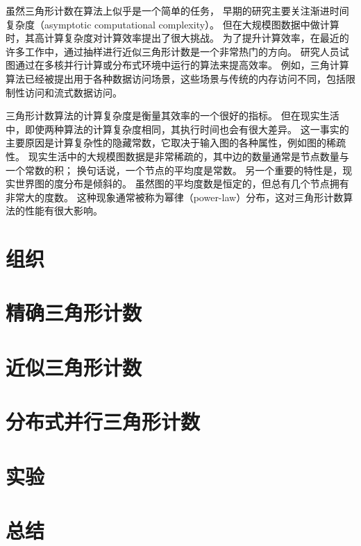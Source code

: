 虽然三角形计数在算法上似乎是一个简单的任务，
早期的研究主要关注渐进时间复杂度（asymptotic computational complexity）\citep{itai1978finding, alon1997finding}。
但在大规模图数据中做计算时，其高计算复杂度对计算效率提出了很大挑战。
为了提升计算效率，在最近的许多工作中，通过抽样进行近似三角形计数是一个非常热门的方向\citep{tsourakakis2008fast,rahman2014sampling,rahman2013approximate,tsourakakis2009doulion,jha2015space,seshadhri2013triadic}。
研究人员试图通过在多核并行计算或分布式环境中运行的算法来提高效率\citep{rahman2013approximate,tsourakakis2009doulion,suri2011counting}。
例如，三角计算算法已经被提出用于各种数据访问场景，这些场景与传统的内存访问不同，包括限制性访问\citep{rahman2014sampling}和流式数据访问\citep{seshadhri2013triadic,buriol2006counting}。

三角形计数算法的计算复杂度是衡量其效率的一个很好的指标。
但在现实生活中，即使两种算法的计算复杂度相同，其执行时间也会有很大差异。
这一事实的主要原因是计算复杂性的隐藏常数，它取决于输入图的各种属性，例如图的稀疏性。
现实生活中的大规模图数据是非常稀疏的，其中边的数量通常是节点数量与一个常数的积；
换句话说，一个节点的平均度是常数。
另一个重要的特性是，现实世界图的度分布是倾斜的。
虽然图的平均度数是恒定的，但总有几个节点拥有非常大的度数。
这种现象通常被称为幂律（power-law）分布\citep{barabasi1999emergence}，这对三角形计数算法的性能有很大影响。

\section{组织}

\section{精确三角形计数}

\section{近似三角形计数}

\section{分布式并行三角形计数}

\section{实验}

\section{总结}